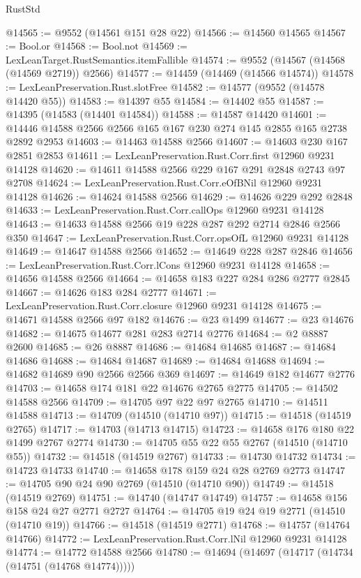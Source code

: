 \begin{lexlean}{RustStd}
\begin{coremodule}
@14565 := @9552 (@14561 @151 @28 @22)
@14566 := @14560 @14565
@14567 := Bool.or
@14568 := Bool.not
@14569 := LexLeanTarget.RustSemantics.itemFallible
@14574 := @9552 (@14567 (@14568 (@14569 @2719)) @2566)
@14577 := @14459 (@14469 (@14566 @14574))
@14578 := LexLeanPreservation.Rust.slotFree
@14582 := @14577 (@9552 (@14578 @14420 @55))
@14583 := @14397 @55
@14584 := @14402 @55
@14587 := @14395 (@14583 (@14401 @14584))
@14588 := @14587 @14420
@14601 := @14446 @14588 @2566 @2566 @165 @167 @230 @274 @145 @2855 @165 @2738 @2892 @2953
@14603 := @14463 @14588 @2566
@14607 := @14603 @230 @167 @2851 @2853
@14611 := LexLeanPreservation.Rust.Corr.first @12960 @9231 @14128
@14620 := @14611 @14588 @2566 @229 @167 @291 @2848 @2743 @97 @2708
@14624 := LexLeanPreservation.Rust.Corr.eOfBNil @12960 @9231 @14128
@14626 := @14624 @14588 @2566
@14629 := @14626 @229 @292 @2848
@14633 := LexLeanPreservation.Rust.Corr.callOps @12960 @9231 @14128
@14643 := @14633 @14588 @2566 @19 @228 @287 @292 @2714 @2846 @2566 @350
@14647 := LexLeanPreservation.Rust.Corr.opsOfL @12960 @9231 @14128
@14649 := @14647 @14588 @2566
@14652 := @14649 @228 @287 @2846
@14656 := LexLeanPreservation.Rust.Corr.lCons @12960 @9231 @14128
@14658 := @14656 @14588 @2566
@14664 := @14658 @183 @227 @284 @286 @2777 @2845
@14667 := @14626 @183 @284 @2777
@14671 := LexLeanPreservation.Rust.Corr.closure @12960 @9231 @14128
@14675 := @14671 @14588 @2566 @97 @182
@14676 := @23 @1499
@14677 := @23 @14676
@14682 := @14675 @14677 @281 @283 @2714 @2776
@14684 := @2 @8887 @2600
@14685 := @26 @8887
@14686 := @14684 @14685
@14687 := @14684 @14686
@14688 := @14684 @14687
@14689 := @14684 @14688
@14694 := @14682 @14689 @90 @2566 @2566 @369
@14697 := @14649 @182 @14677 @2776
@14703 := @14658 @174 @181 @22 @14676 @2765 @2775
@14705 := @14502 @14588 @2566
@14709 := @14705 @97 @22 @97 @2765
@14710 := @14511 @14588
@14713 := @14709 (@14510 (@14710 @97))
@14715 := @14518 (@14519 @2765)
@14717 := @14703 (@14713 @14715)
@14723 := @14658 @176 @180 @22 @1499 @2767 @2774
@14730 := @14705 @55 @22 @55 @2767 (@14510 (@14710 @55))
@14732 := @14518 (@14519 @2767)
@14733 := @14730 @14732
@14734 := @14723 @14733
@14740 := @14658 @178 @159 @24 @28 @2769 @2773
@14747 := @14705 @90 @24 @90 @2769 (@14510 (@14710 @90))
@14749 := @14518 (@14519 @2769)
@14751 := @14740 (@14747 @14749)
@14757 := @14658 @156 @158 @24 @27 @2771 @2727
@14764 := @14705 @19 @24 @19 @2771 (@14510 (@14710 @19))
@14766 := @14518 (@14519 @2771)
@14768 := @14757 (@14764 @14766)
@14772 := LexLeanPreservation.Rust.Corr.lNil @12960 @9231 @14128
@14774 := @14772 @14588 @2566
@14780 := @14694 (@14697 (@14717 (@14734 (@14751 (@14768 @14774)))))

\end{coremodule}
\end{lexlean}

